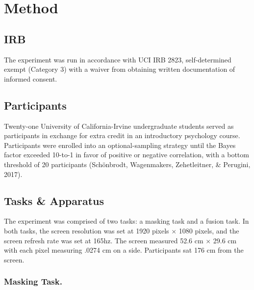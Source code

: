 \documentclass[
  ,man]{apa6}
\begin{document}
\hypertarget{method}{%
\section{Method}\label{method}}

\hypertarget{irb}{%
\subsection{IRB}\label{irb}}

The experiment was run in accordance with UCI IRB 2823, self-determined exempt (Category 3) with a waiver from obtaining written documentation of informed consent.

\hypertarget{participants}{%
\subsection{Participants}\label{participants}}

Twenty-one University of California-Irvine undergraduate students served as participants in exchange for extra credit in an introductory psychology course. Participants were enrolled into an optional-sampling strategy until the Bayes factor exceeded 10-to-1 in favor of positive or negative correlation, with a bottom threshold of 20 participants (Schönbrodt, Wagenmakers, Zehetleitner, \& Perugini, 2017).

\hypertarget{tasks-apparatus}{%
\subsection{Tasks \& Apparatus}\label{tasks-apparatus}}

The experiment was comprised of two tasks: a masking task and a fusion task. In both tasks, the screen resolution was set at 1920 pixels \(\times\) 1080 pixels, and the screen refresh rate was set at 165hz. The screen measured 52.6 cm \(\times\) 29.6 cm with each pixel measuring .0274 cm on a side. Participants sat 176 cm from the screen.

\hypertarget{masking-task.}{%
\subsubsection{Masking Task.}\label{masking-task.}}
\end{document}
